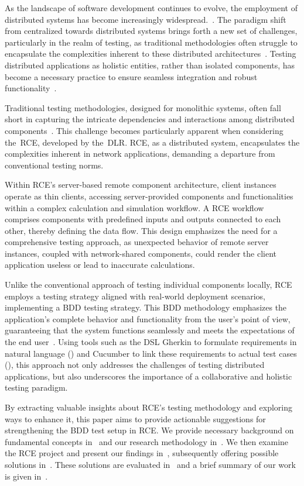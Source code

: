 As the landscape of software development continues to evolve, the employment of distributed systems has become increasingly widespread.~\cite{Xingang2018,Feldman1978}. The paradigm shift from centralized towards distributed systems brings forth a new set of challenges, particularly in the realm of testing, as traditional methodologies often struggle to encapsulate the complexities inherent to these distributed architectures~\cite{Liu,Lima2017}. Testing distributed applications as holistic entities, rather than isolated components, has become a necessary practice to ensure seamless integration and robust functionality~\cite{Liu,Lima2017}.

Traditional testing methodologies, designed for monolithic systems, often fall short in capturing the intricate dependencies and interactions among distributed components~\cite{Liu,Lima2017}. This challenge becomes particularly apparent when considering the~\acf{RCE}, developed by the~\acf{DLR}. \ac{RCE}, as a distributed system, encapsulates the complexities inherent in network applications, demanding a departure from conventional testing norms.

Within \ac{RCE}'s server-based remote component architecture, client instances operate as thin clients, accessing server-provided components and functionalities within a complex calculation and simulation workflow. A \ac{RCE} workflow comprises components with predefined inputs and outputs connected to each other, thereby defining the data flow. This design emphasizes the need for a comprehensive testing approach, as unexpected behavior of remote server instances, coupled with network-shared components, could render the client application useless or lead to inaccurate calculations.

Unlike the conventional approach of testing individual components locally, \ac{RCE} employs a testing strategy aligned with real-world deployment scenarios, implementing a \acf{BDD} testing strategy. This \ac{BDD} methodology emphasizes the application's complete behavior and functionality from the user's point of view, guaranteeing that the system functions seamlessly and meets the expectations of the end user~\cite{wynne2012cucumber}. Using tools such as the \ac{DSL} Gherkin to formulate requirements in natural language () and Cucumber to link these requirements to actual test cases (), this approach not only addresses the challenges of testing distributed applications, but also underscores the importance of a collaborative and holistic testing paradigm.

By extracting valuable insights about \ac{RCE}'s testing methodology and exploring ways to enhance it, this paper aims to provide actionable suggestions for strengthening the \ac{BDD} test setup in \ac{RCE}. We provide necessary background on fundamental concepts in~ and our research methodology in~. We then examine the \ac{RCE} project and present our findings in~, subsequently offering possible solutions in~. These solutions are evaluated in~ and a brief summary of our work is given in~.